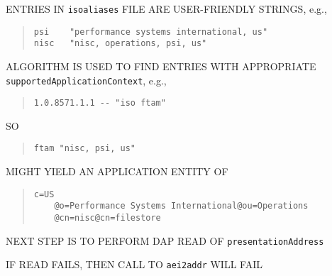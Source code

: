 \begin{bwslide}

\begin{nrtc}
\item	ENTRIES IN \verb"isoaliases" FILE ARE USER-FRIENDLY STRINGS,
	e.g.,
\begin{quote}\small\begin{verbatim}
psi    "performance systems international, us"
nisc   "nisc, operations, psi, us"
\end{verbatim}\end{quote}

\item	ALGORITHM IS USED TO FIND ENTRIES WITH APPROPRIATE
	\verb"supportedApplicationContext", e.g.,
\begin{quote}\small\begin{verbatim}
1.0.8571.1.1 -- "iso ftam"
\end{verbatim}\end{quote}
	SO
\begin{quote}\small\begin{verbatim}
ftam "nisc, psi, us"
\end{verbatim}\end{quote}
	MIGHT YIELD AN APPLICATION ENTITY OF
\begin{quote}\smaller\begin{verbatim}
c=US
    @o=Performance Systems International@ou=Operations
    @cn=nisc@cn=filestore
\end{verbatim}\end{quote}

\item	NEXT STEP IS TO PERFORM DAP READ OF \verb"presentationAddress"

\item	IF READ FAILS, THEN CALL TO \verb"aei2addr" WILL FAIL
\end{nrtc}
\end{bwslide}





